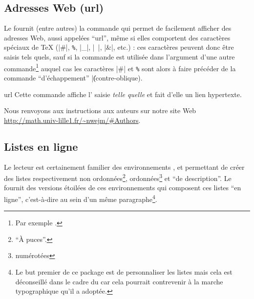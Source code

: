 \documentclass[english,nolocaltoc]{nwejmart}
\newtheorem[style=definition]{fait}
\newtheorem[title=expérience]{experience}
\newtheorem[title-plural=anneaux]{anneau}
\newtheorem[title=idéal,title-plural=idéaux]{ideal}
\begin{document}

\subsection{Adresses Web (\texorpdfstring{\acrshort{url}}{URL})}
\label{sec-url}

Le  fournit (entre autres) la commande  qui
permet de facilement afficher des adresses Web, aussi appelées
\enquote{\gls{url}}, même si elles comportent des caractères spéciaux de \TeX{}
(|#|,
%
\lstinline[commentstyle={}]+%+,
%
|_|, |~|, |&|, etc.) : ces caractères peuvent donc être saisis tels quels, sauf
si la commande  est utilisée dans l'argument d'une autre
commande\footnote{Par exemple \protect{}.} auquel cas les
caractères |#| et
%
\lstinline[commentstyle={}]+%+
%
sont alors à faire précéder de la commande \enquote{d'échappement} |\|
(contre-oblique).%

\begin{docCommand}{url}{}
  Cette commande affiche l' saisie \emph{telle quelle} et fait
  d'elle un lien hypertexte.
\begin{bodycode}[listing and text,listing options={alsolanguage={[hyperref]TeX},deletekeywords={[2]url}}]
Nous renvoyons aux instructions aux auteurs sur notre site Web
\url{http://math.univ-lille1.fr/~nwejm/#Authors}.
\end{bodycode}
\end{docCommand}

\subsection{Listes en ligne}
\label{sec:listes-en-ligne}

Le lecteur est certainement familier des environnements
,  et
 permettant de créer des listes respectivement
non ordonnées\footnote{\enquote{À puces}.}, ordonnées\footnote{\Ie*{}
  numérotées} et \enquote{de description}. Le  fournit des
versions étoilées de ces environnements qui composent ces listes \enquote{en
  ligne}, c'est-à-dire au sein d'un même paragraphe\footnote{Le but premier de
  ce package est de personnaliser les listes mais cela est déconseillé dans le
  cadre du \nwejm{} car cela pourrait contrevenir à la marche typographique
  qu'il a adoptée.}.
\end{document}
